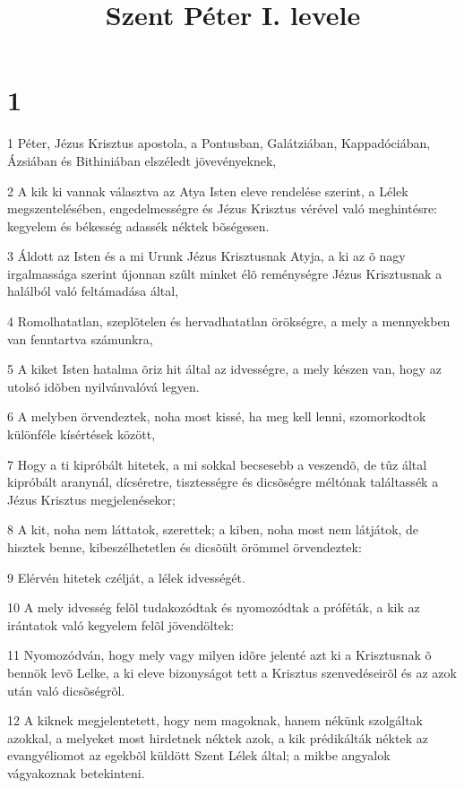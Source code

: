 

\title{Szent Péter I. levele}


\chapter{1}

\par 1 Péter, Jézus Krisztus apostola, a Pontusban, Galátziában, Kappadóciában, Ázsiában és Bithiniában elszéledt jövevényeknek,
\par 2 A kik ki vannak választva az Atya Isten eleve rendelése szerint, a Lélek megszentelésében, engedelmességre és Jézus Krisztus vérével való meghintésre: kegyelem és békesség adassék néktek bõségesen.
\par 3 Áldott az Isten és a mi Urunk Jézus Krisztusnak Atyja, a ki az õ nagy irgalmassága szerint újonnan szûlt minket élõ reménységre Jézus Krisztusnak a halálból való feltámadása által,
\par 4 Romolhatatlan, szeplõtelen és hervadhatatlan örökségre, a mely a mennyekben van fenntartva számunkra,
\par 5 A kiket Isten hatalma õriz hit által az idvességre, a mely készen van, hogy az utolsó idõben nyilvánvalóvá legyen.
\par 6 A melyben örvendeztek, noha most kissé, ha meg kell lenni, szomorkodtok különféle kísértések között,
\par 7 Hogy a ti kipróbált hitetek, a mi sokkal becsesebb a veszendõ, de tûz által kipróbált aranynál, dícséretre, tisztességre és dicsõségre méltónak találtassék a Jézus Krisztus megjelenésekor;
\par 8 A kit, noha nem láttatok, szerettek; a kiben, noha most nem látjátok, de hisztek benne, kibeszélhetetlen és dicsõült örömmel örvendeztek:
\par 9 Elérvén hitetek czélját, a lélek idvességét.
\par 10 A mely idvesség felõl tudakozódtak és nyomozódtak a próféták, a kik az irántatok való kegyelem felõl jövendöltek:
\par 11 Nyomozódván, hogy mely vagy milyen idõre jelenté azt ki a Krisztusnak õ bennök levõ Lelke, a ki eleve bizonyságot tett a Krisztus szenvedéseirõl és az azok után való dicsõségrõl.
\par 12 A kiknek megjelentetett, hogy nem magoknak, hanem nékünk szolgáltak azokkal, a melyeket most hirdetnek néktek azok, a kik prédikálták néktek az evangyéliomot az egekbõl küldött Szent Lélek által; a mikbe angyalok vágyakoznak betekinteni.
